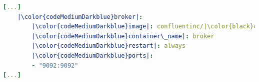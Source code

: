 \begin{lstlisting}[language=yaml, caption={port-binding del servizio \textit{broker} alla voce \textit{ports} (porta\_host:porta\_container) }, label=lst:port-binding]
[...]
	|\color{codeMediumDarkblue}broker|:
		|\color{codeMediumDarkblue}image|: confluentinc/|\color{black}cp-kafka:7.3.0|
		|\color{codeMediumDarkblue}container\_name|: broker
		|\color{codeMediumDarkblue}restart|: always
		|\color{codeMediumDarkblue}ports|:
		- "9092:9092"
[...]
\end{lstlisting}

\clearpage